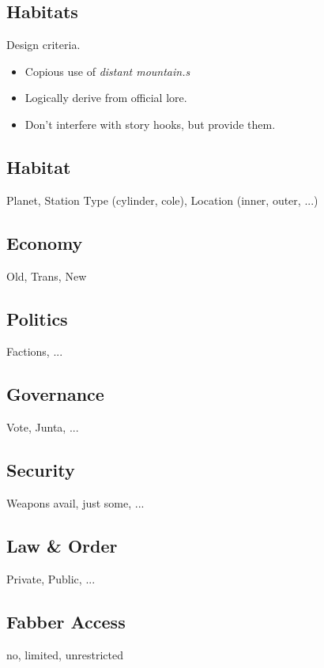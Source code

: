 \begin{multicols}{2}

\section*{Habitats}

Design criteria.

\begin{itemize}
    \item Copious use of \textit{distant mountain.s}
    \item Logically derive from official \eclipsephase lore.
    \item Don't interfere with story hooks, but provide them.
\end{itemize}

\subsection*{Habitat} Planet, Station Type (cylinder, cole), Location (inner, outer, ...)
\subsection*{Economy} Old, Trans, New
\subsection*{Politics} Factions, ...
\subsection*{Governance} Vote, Junta, ...
\subsection*{Security} Weapons avail, just some, ...
\subsection*{Law \& Order} Private, Public, ...
\subsection*{Fabber Access} no, limited, unrestricted


\end{multicols}
